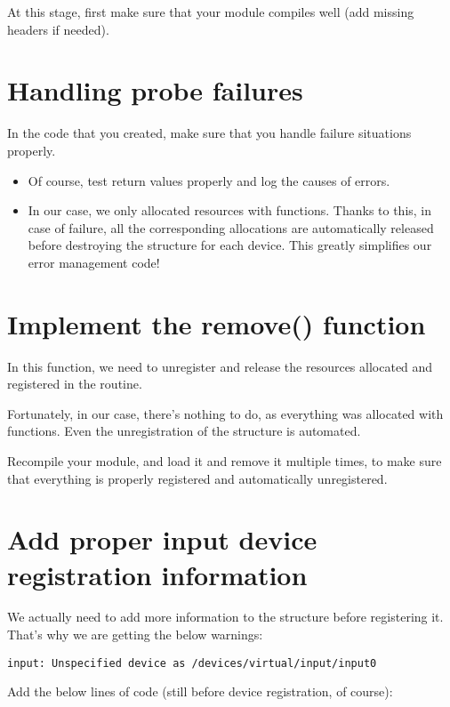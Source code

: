 At this stage, first make sure that your module compiles well (add
missing headers if needed).

\section{Handling probe failures}

In the code that you created, make sure that you handle failure
situations properly.

\begin{itemize}
\item Of course, test return values properly and log
      the causes of errors.
\item In our case, we only allocated resources with 
      functions. Thanks to this, in case of failure, all the
      corresponding allocations are automatically released
      before destroying the  structure for each
      device. This greatly simplifies our error management code!
\end{itemize}

\section{Implement the remove() function}

In this function, we need to unregister and release the resources allocated
and registered in the  routine.

Fortunately, in our case, there's nothing to do, as everything
was allocated with  functions. Even the unregistration
of the  structure is automated. 

Recompile your module, and load it and remove it multiple times, to
make sure that everything is properly registered and automatically
unregistered.

\section{Add proper input device registration information}

We actually need to add more information to the  structure before
registering it. That's why we are getting the below warnings:

\begin{verbatim}
input: Unspecified device as /devices/virtual/input/input0
\end{verbatim}

Add the below lines of code (still before device registration, of
course):

